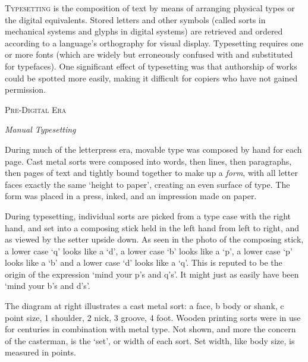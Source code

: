\documentclass{slipbox}
\makeatletter
\def\section#1{\addvspace{\baselineskip}\noindent\textsc{#1}\par\addvspace{\baselineskip}\@afterheading\@afterindentfalse}
\def\subsection#1{\addvspace{\baselineskip}\noindent\textit{#1}\par\addvspace{\baselineskip}\@afterheading\@afterindentfalse}
\makeatother
\begin{document}
  \begin{slip}
    {\centering{}\par}
    \vspace{2\baselineskip}

    \noindent\textsc{Typesetting} is the composition of text by means of arranging physical types or the digital equivalents. Stored letters and other symbols (called sorts in mechanical systems and glyphs in digital systems) are retrieved and ordered according to a language's orthography for visual display. Typesetting requires one or more fonts (which are widely but erroneously confused with and substituted for typefaces). One significant effect of typesetting was that authorship of works could be spotted more easily, making it difficult for copiers who have not gained permission.

    \section{Pre-Digital Era}

    \subsection{Manual Typesetting}
    During much of the letterpress era, movable type was composed by hand for each page. Cast metal sorts were composed into words, then lines, then paragraphs, then pages of text and tightly bound together to make up a \emph{form}, with all letter faces exactly the same `height to paper', creating an even surface of type. The form was placed in a press, inked, and an impression made on paper.

    During typesetting, individual sorts are picked from a type case with the right hand, and set into a composing stick held in the left hand from left to right, and as viewed by the setter upside down. As seen in the photo of the composing stick, a lower case `q' looks like a `d', a lower case `b' looks like a `p', a lower case `p' looks like a `b' and a lower case `d' looks like a `q'. This is reputed to be the origin of the expression `mind your p's and q's'. It might just as easily have been `mind your b's and d's'.

    The diagram at right illustrates a cast metal sort: a face, b body or shank, c point size, 1 shoulder, 2 nick, 3 groove, 4 foot. Wooden printing sorts were in use for centuries in combination with metal type. Not shown, and more the concern of the casterman, is the `set', or width of each sort. Set width, like body size, is measured in points.


\end{slip}
\end{document}
